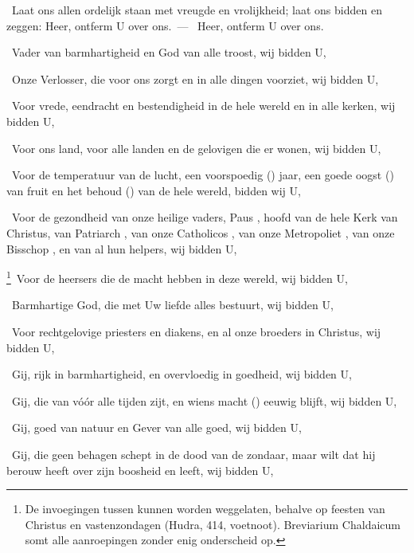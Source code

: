 \documentclass[12pt,twoside,a5paper]{article}
\begin{document}

\begin{halfparskip}
   \dd~Laat ons allen ordelijk staan met vreugde en vrolijkheid; laat ons bidden en zeggen: Heer, ontferm U over ons.~--- \rr~Heer, ontferm U over ons. 

  \dd~Vader van barmhartigheid en God van alle troost, wij bidden U,

  \dd~Onze Verlosser, die voor ons zorgt en in alle dingen voorziet, wij bidden U,

  \dd~Voor vrede, eendracht en bestendigheid in de hele wereld en in alle kerken, wij bidden U,

  \dd~Voor ons land, voor alle landen en de gelovigen die er wonen, wij bidden U,

  \dd~Voor de temperatuur van de lucht, een voorspoedig () jaar, een goede oogst () van fruit en het behoud () van de hele wereld, bidden wij U,

  \dd~Voor de gezondheid van onze heilige vaders, Paus \NN , hoofd van de hele Kerk van Christus, van Patriarch \NN , van onze Catholicos \NN , van onze Metropoliet \NN , van onze Bisschop \NN , en van al hun helpers, wij bidden U,

  \liturgicallbracket\footnote{De invoegingen tussen \liturgicaloption{[\ ]} kunnen worden weggelaten, behalve op feesten van Christus en vastenzondagen (Hudra, 414, voetnoot). Breviarium Chaldaicum somt alle aanroepingen zonder enig onderscheid op.}\dd~Voor de heersers die de macht hebben in deze wereld, wij bidden U,\liturgicalrbracket

  \dd~Barmhartige God, die met Uw liefde alles bestuurt, wij bidden U,

  \liturgicallbracket\dd~Voor rechtgelovige priesters en diakens, en al onze broeders in Christus, wij bidden U,\liturgicalrbracket

  \dd~Gij, rijk in barmhartigheid, en overvloedig in goedheid, wij bidden U,

  \liturgicallbracket\dd~Gij, die van vóór alle tijden zijt, en wiens macht () eeuwig blijft, wij bidden U,\liturgicalrbracket

  \dd~Gij, goed van natuur en Gever van alle goed, wij bidden U,

  \liturgicallbracket\dd~Gij, die geen behagen schept in de dood van de zondaar, maar wilt dat hij berouw heeft over zijn boosheid en leeft, wij bidden U,\liturgicalrbracket


\end{halfparskip}
\end{document}
